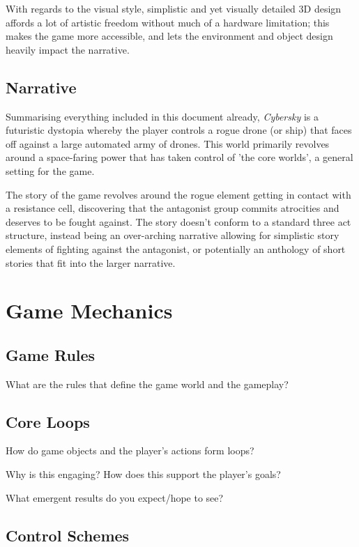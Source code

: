 \documentclass{scrartcl}
\begin{document}
With regards to the visual style, simplistic and yet visually detailed 3D design affords a lot of artistic freedom without much of a hardware limitation; this makes the game more accessible, and lets the environment and object design heavily impact the narrative.

\subsection{Narrative}

Summarising everything included in this document already, \emph{Cybersky} is a futuristic dystopia whereby the player controls a rogue drone (or ship) that faces off against a large automated army of drones. This world primarily revolves around a space-faring power that has taken control of 'the core worlds', a general setting for the game.

The story of the game revolves around the rogue element getting in contact with a resistance cell, discovering that the antagonist group commits atrocities and deserves to be fought against. The story doesn't conform to a standard three act structure, instead being an over-arching narrative allowing for simplistic story elements of fighting against the antagonist, or potentially an anthology of short stories that fit into the larger narrative.

\section{
  Game Mechanics
 }

\subsection{Game Rules}

What are the rules that define the game world and the gameplay?

\subsection{Core Loops}

How do game objects and the player’s actions form loops?

Why is this engaging? How does this support the player’s goals?

What emergent results do you expect/hope to see?

\subsection{Control Schemes}
\end{document}
